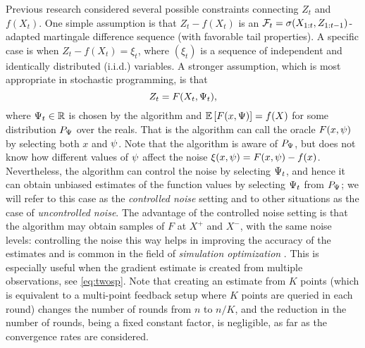 Previous research considered several possible constraints connecting $Z_t$ and $f(X_t)$.
One simple assumption is that $Z_t-f(X_t)$ is an $\mathcal{F}_t = \sigma(X_{1:t},Z_{1:t-1})$-adapted martingale difference sequence (with favorable tail properties).
A specific case is when $Z_t - f(X_t) = \xi_t$, where $(\xi_t)$ is a sequence of independent and identically distributed (i.i.d.) variables.
A stronger assumption, which is most appropriate in stochastic programming,
is that 
\begin{equation}
\label{eq:controlled}
Z_t = F(X_t,\Psi_t),
\end{equation} where $\Psi_t\in \mathbb{R}$ is chosen by the algorithm and $\mathbb{E}\left[F(x,\Psi)\right]=f(X)$ for some distribution $P_{\Psi}$ over the reals. That is the algorithm can call the oracle $F(x,\psi)$ by selecting both $x$ and $\psi$. Note that the algorithm is aware of $P_{\Psi}$, but does not know how different values of $\psi$ affect the noise $\xi(x,\psi)=F(x,\psi)-f(x)$. Nevertheless, the algorithm can control the noise by selecting $\Psi_t$, and hence it can obtain unbiased estimates of the function values by selecting $\Psi_t$ from $P_{\Psi}$; we will refer to this case as the \emph{controlled noise} setting and to other situations as the case of \emph{uncontrolled noise}. The advantage of the controlled noise setting is that the algorithm may obtain samples of $F$ at $X^+$ and $X^-$, with the same noise levels:
controlling the noise this way helps in improving the accuracy of the estimates and is common in the field of \emph{simulation optimization}
\citep{KlSpNa99,duchi2015optimal}. This is especially useful when the gradient estimate is created from multiple observations, see \eqref{eq:twosp}. Note that creating an estimate from $K$ points (which is equivalent to a multi-point feedback setup where $K$ points are queried in each round) changes the number of rounds from $n$ to $n/K$, and  the reduction in the number of rounds, being a fixed constant factor, is negligible, as far as the convergence rates are considered.


%
%


